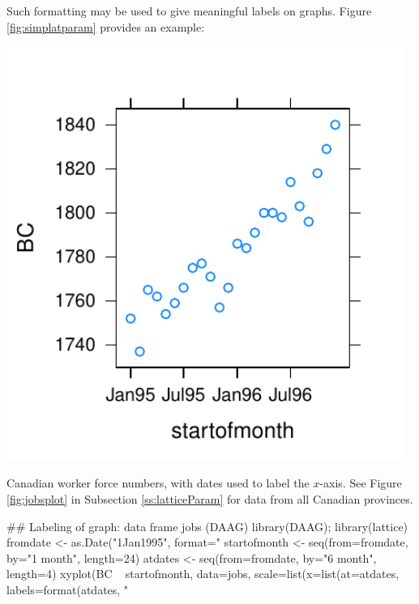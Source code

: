 Such formatting may be used to give meaningful labels on graphs.
Figure \ref{fig:simplatparam} provides an example:
\begin{marginfigure}[2cm]
\begin{Schunk}


\centerline{\includegraphics[width=0.97\textwidth]{figs/06-date-labs-1} }

\end{Schunk}
 \caption{Canadian worker force numbers, with dates used to label the
   $x$-axis. See Figure \ref{fig:jobsplot} in
   Subsection \ref{ss:latticeParam} for data from all Canadian
 provinces.}\label{fig:simplatparam}
\end{marginfigure}
\begin{Schunk}
\begin{Sinput}
## Labeling of graph: data frame jobs (DAAG)
library(DAAG); library(lattice)
fromdate <- as.Date("1Jan1995", format="%
startofmonth <- seq(from=fromdate, by="1 month",
                    length=24)
atdates <- seq(from=fromdate, by="6 month",
               length=4)
xyplot(BC ~ startofmonth, data=jobs,
       scale=list(x=list(at=atdates,
                         labels=format(atdates,
                                       "%
\end{Sinput}
\end{Schunk}

